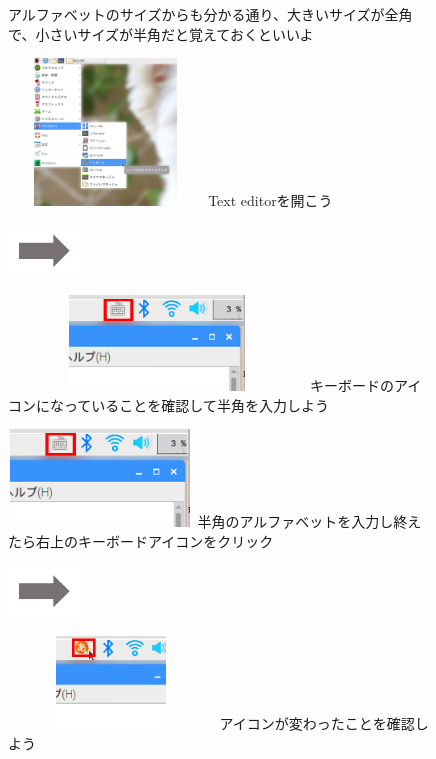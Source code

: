 \documentclass[a4paper,12pt]{jarticle}
\begin{document}
\begin{figure}[ht]
\begin{minipage}{16.578cm}
    アルファベットのサイズからも分かる通り、大きいサイズが全角で、小さいサイズが半角だと覚えておくといいよ
  \end{minipage}
  \begin{minipage}{5.578cm}
    \includegraphics[width=5.172cm,height=3.924cm]{textbook-img067.png}
     Text editorを開こう
  \end{minipage}
  \includegraphics[width=1.919cm,height=1.365cm]{textbook-img053.png}
  \begin{minipage}{7.931cm}
    \includegraphics[width=7.868cm,height=2.534cm]{textbook-img059.png}
    キーボードのアイコンになっていることを確認して半角を入力しよう
  \end{minipage}
  \begin{minipage}{6.345cm}
    \includegraphics[width=4.889cm,height=2.596cm]{textbook-img059.png}
    半角のアルファベットを入力し終えたら右上のキーボードアイコンをクリック
  \end{minipage}
  \includegraphics[width=1.919cm,height=1.365cm]{textbook-img053.png}
  \begin{minipage}{7.524cm}
    \includegraphics[width=5.471cm,height=2.469cm]{textbook-img062.png}
    アイコンが変わったことを確認しよう
  \end{minipage}


\end{figure}
\end{document}
